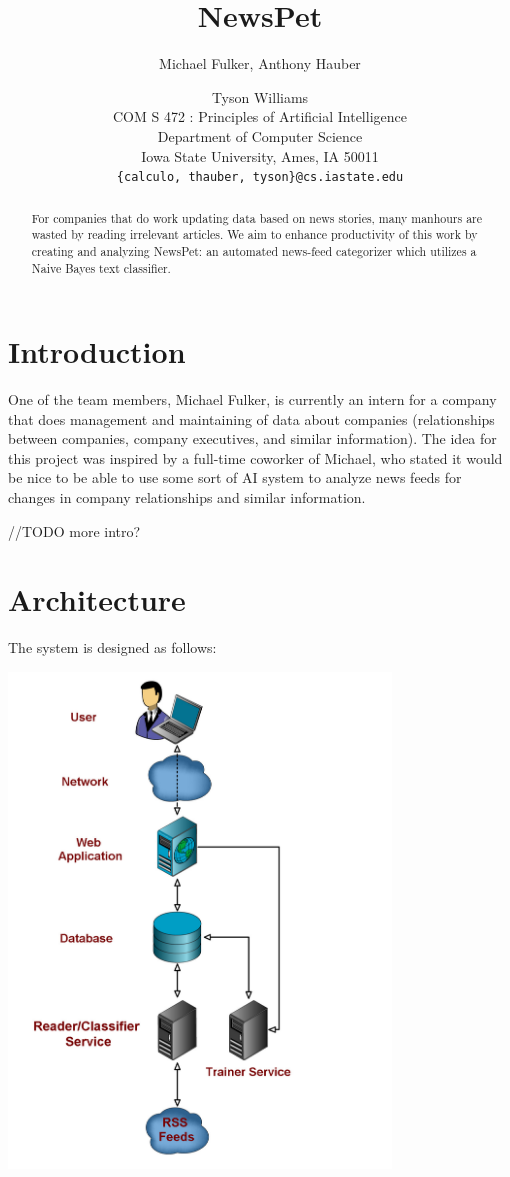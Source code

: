 \documentclass[letterpaper]{article}
\title{NewsPet}
\author{Michael Fulker, Anthony Hauber \and Tyson Williams \\
COM S 472 : Principles of Artificial Intelligence\\Department of Computer Science\\ Iowa State University, Ames, IA 50011\\
\texttt{\{calculo, thauber, tyson\}@cs.iastate.edu}}
\begin{document}
\nocopyright%
\maketitle

\begin{abstract}
For companies that do work updating data based on news stories, many manhours are wasted by reading irrelevant articles. We aim to enhance productivity of this work by creating and analyzing NewsPet: an automated news-feed categorizer which utilizes a Naive Bayes text classifier.
\end{abstract}


\section{Introduction}
One of the team members, Michael Fulker, is currently an intern for a company that does management and maintaining of data about companies (relationships between companies, company executives, and similar information). The idea for this project was inspired by a full-time coworker of Michael, who stated it would be nice to be able to use some sort of AI system to analyze news feeds for changes in company relationships and similar information.

//TODO more intro?

\section{Architecture}
The system is designed as follows:

\noindent\includegraphics[width=4in]{arch-diagram.pdf}
\end{document}

